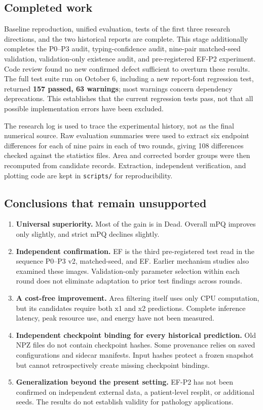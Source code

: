\documentclass[11pt,a4paper]{article}
\newcommand{\code}[1]{\nolinkurl{#1}}
\begin{document}
\subsection{Completed work}

Baseline reproduction, unified evaluation, tests of the first three research directions, and the two historical reports are complete. This stage additionally completes the P0--P3 audit, typing-confidence audit, nine-pair matched-seed validation, validation-only existence audit, and pre-registered EF-P2 experiment. Code review found no new confirmed defect sufficient to overturn these results. The full test suite run on October 6, including a new report-font regression test, returned \textbf{157 passed, 63 warnings}; most warnings concern dependency deprecations. This establishes that the current regression tests pass, not that all possible implementation errors have been excluded.

The research log\cite{findings} is used to trace the experimental history, not as the final numerical source. Raw evaluation summaries were used to extract six endpoint differences for each of nine pairs in each of two rounds, giving 108 differences checked against the statistics files. Area and corrected border groups were then recomputed from candidate records. Extraction, independent verification, and plotting code are kept in \code{scripts/} for reproducibility.

\subsection{Conclusions that remain unsupported}

\begin{enumerate}
\item \textbf{Universal superiority.} Most of the gain is in Dead. Overall mPQ improves only slightly, and strict mPQ declines slightly.
\item \textbf{Independent confirmation.} EF is the third pre-registered test read in the sequence P0--P3 v2, matched-seed, and EF. Earlier mechanism studies also examined these images. Validation-only parameter selection within each round does not eliminate adaptation to prior test findings across rounds.
\item \textbf{A cost-free improvement.} Area filtering itself uses only CPU computation, but its candidates require both x1 and x2 predictions. Complete inference latency, peak resource use, and energy have not been measured.
\item \textbf{Independent checkpoint binding for every historical prediction.} Old NPZ files do not contain checkpoint hashes. Some provenance relies on saved configurations and sidecar manifests. Input hashes protect a frozen snapshot but cannot retrospectively create missing checkpoint bindings.
\item \textbf{Generalization beyond the present setting.} EF-P2 has not been confirmed on independent external data, a patient-level resplit, or additional seeds. The results do not establish validity for pathology applications.
\end{enumerate}
\end{document}
